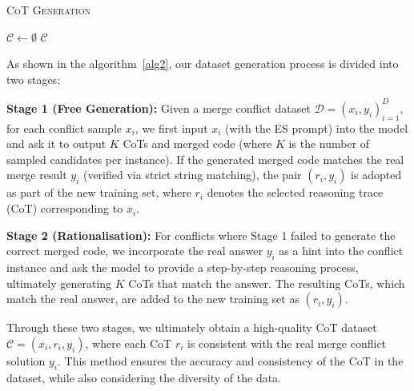 \documentclass[sigconf,review,anonymous]{acmart}
\begin{document}
\begin{algorithm}[t]
\caption{\textsc{CoT Generation}}\label{alg2}
\BlankLine
$\mathcal{C} \gets \emptyset$\;
\Return $\mathcal{C}$\;
\end{algorithm}

As shown in the algorithm~\ref{alg2}, our dataset generation process is divided into two stages:

\textbf{Stage 1 (Free Generation):} Given a merge conflict dataset $\mathcal{D}={(x_i,y_i)}_{i=1}^{D}$, for each conflict sample $x_i$, we first input $x_i$ (with the ES prompt) into the model and ask it to output $K$ CoTs and merged code (where $K$ is the number of sampled candidates per instance). If the generated merged code matches the real merge result $y_i$ (verified via strict string matching), the pair $(r_i, y_i)$ is adopted as part of the new training set, where $r_i$ denotes the selected reasoning trace (CoT) corresponding to $x_i$.

\textbf{Stage 2 (Rationalisation):} For conflicts where Stage 1 failed to generate the correct merged code, we incorporate the real answer $y_i$ as a hint into the conflict instance and ask the model to provide a step-by-step reasoning process, ultimately generating $K$ CoTs that match the answer. 
The resulting CoTs, which match the real answer, are added to the new training set as $(r_i, y_i)$.

Through these two stages, we ultimately obtain a high-quality CoT dataset $\mathcal{C}={(x_i, r_i, y_i)}$, where each CoT $r_i$ is consistent with the real merge conflict solution $y_i$. This method ensures the accuracy and consistency of the CoT in the dataset, while also considering the diversity of the data.
\end{document}
